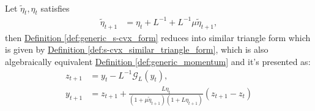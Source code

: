 \documentclass[12pt]{article}
\begin{document}
        \begin{theorem}
        \label{thm:momentum_is_similar_triangle}
            \;\\
            Let $\tilde \eta_t, \eta_t$
            satisfies 
            \begin{align*}
                \tilde\eta_{t + 1} &= \eta_t + L^{-1} + L^{-1} \mu \tilde\eta_{t + 1},
            \end{align*}
            then
            \hyperref[def:generic_s-cvx_form]{Definition \ref*{def:generic_s-cvx_form}}
            reduces into similar triangle form which is given by 
            \hyperref[def:s-cvx_similar_triangle_form]
            {Definition \ref*{def:s-cvx_similar_triangle_form}}, 
            which is also algebraically equivalent 
            \hyperref[def:generic_momentum]{Definition \ref*{def:generic_momentum}}
            and it's presented as:
            \begin{align*}
                z_{t + 1} &= y_t - L^{-1}\mathcal G_L(y_t), 
                \\
                y_{t + 1} &= z_{t + 1} + 
                \frac{L\eta_t}{(1 + \mu \tilde\eta_{t + 1})(1 + L\eta_{t + 1})}(z_{t + 1} - z_t)
            \end{align*}
        \end{theorem}
\end{document}
